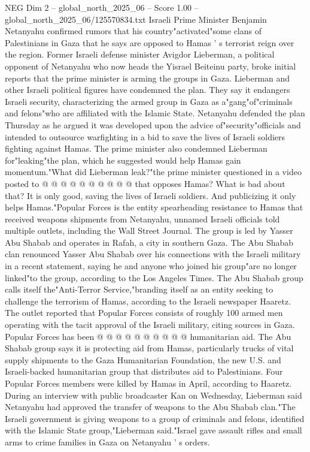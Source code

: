 \begin{textsample}{NEG Dim 2 – global\_north\_2025\_06 – Score 1.00 – global\_north\_2025\_06/125570834.txt}  \label{ex:f2_neg_087}
Israeli Prime Minister Benjamin Netanyahu confirmed rumors that his country"activated"some clans of Palestinians in Gaza that he says are opposed to Hamas ' s terrorist reign over the region.
Former Israeli defense minister Avigdor Lieberman, a political opponent of Netanyahu who now heads the Yisrael Beiteinu party, broke initial reports that the prime minister is arming the groups in Gaza.
Lieberman and other Israeli political figures have condemned the plan.
They say it endangers Israeli security, characterizing the armed group in Gaza as a"gang"of"criminals and felons"who are affiliated with the Islamic State.
Netanyahu defended the plan Thursday as he argued it was developed upon the advice of"security"officials and intended to outsource warfighting in a bid to save the lives of Israeli soldiers fighting against Hamas.
The prime minister also condemned Lieberman for"leaking"the plan, which he suggested would help Hamas gain momentum."What did Lieberman leak?"the prime minister questioned in a video posted to @ @ @ @ @ @ @ @ @ @ that opposes Hamas?
What is bad about that?
It is only good, saving the lives of Israeli soldiers.
And publicizing it only helps Hamas."Popular Forces is the entity spearheading resistance to Hamas that received weapons shipments from Netanyahu, unnamed Israeli officials told multiple outlets, including the Wall Street Journal.
The group is led by Yasser Abu Shabab and operates in Rafah, a city in southern Gaza.
The Abu Shabab clan renounced Yasser Abu Shabab over his connections with the Israeli military in a recent statement, saying he and anyone who joined his group"are no longer linked"to the group, according to the Los Angeles Times.
The Abu Shabab group calls itself the"Anti-Terror Service,"branding itself as an entity seeking to challenge the terrorism of Hamas, according to the Israeli newspaper Haaretz.
The outlet reported that Popular Forces consists of roughly 100 armed men operating with the tacit approval of the Israeli military, citing sources in Gaza.
Popular Forces has been @ @ @ @ @ @ @ @ @ @ humanitarian aid.
The Abu Shabab group says it is protecting aid from Hamas, particularly trucks of vital supply shipments to the Gaza Humanitarian Foundation, the new U.S. and Israeli-backed humanitarian group that distributes aid to Palestinians.
Four Popular Forces members were killed by Hamas in April, according to Haaretz.
During an interview with public broadcaster Kan on Wednesday, Lieberman said Netanyahu had approved the transfer of weapons to the Abu Shabab clan."The Israeli government is giving weapons to a group of criminals and felons, identified with the Islamic State group,"Lieberman said."Israel gave assault rifles and small arms to crime families in Gaza on Netanyahu ' s orders.

\end{textsample}
